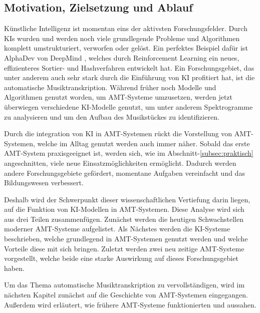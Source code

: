\subsection{Motivation, Zielsetzung und Ablauf}
Künstliche Intelligenz ist momentan eins der aktivsten Forschungsfelder.
Durch KIs wurden und werden noch viele grundlegende Probleme
und Algorithmen komplett umstrukturiert, verworfen oder gelöst.
Ein perfektes Beispiel dafür ist AlphaDev von DeepMind \cite{mankowitz2023faster},
welches durch Reinforcement Learning ein neues, effizienteres Sortier- und Hashverfahren entwickelt hat.
Ein Forschungsgebiet, das unter anderem auch sehr stark durch die Einführung von KI profitiert hat,
ist die automatische Musiktranskription.
Während früher noch Modelle und Algorithmen genutzt worden, um AMT-Systeme umzusetzen,
werden jetzt überwiegen verschiedene KI-Modelle genutzt,
um unter anderem Spektrogramme zu analysieren und um den Aufbau des Musikstückes zu identifizieren.

Durch die integration von KI in AMT-Systemen rückt die Vorstellung von AMT-Systemen,
welche im Alltag genutzt werden auch immer näher.
Sobald das erste AMT-System praxisgeeignet ist, werden sich, wie im Abschnitt-\ref{subsec:praktisch} angeschnitten,
viele neue Einsatzmöglichkeiten ermöglicht.
Dadurch werden andere Forschungsgebiete gefördert, momentane Aufgaben vereinfacht und das Bildungswesen verbessert.

Deshalb wird der Schwerpunkt dieser wissenschaftlichen Vertiefung darin liegen,
auf die Funktion von KI-Modellen in AMT-Systemen.
Diese Analyse wird sich aus drei Teilen zusammenfügen.
Zunächst werden die heutigen Schwachstellen moderner AMT-Systeme aufgelistet.
Als Nächstes werden die KI-Systeme beschrieben,
welche grundlegend in AMT-Systemen genutzt werden und welche Vorteile diese mit sich bringen.
Zuletzt werden zwei neu zeitige AMT-Systeme vorgestellt,
welche beide eine starke Auswirkung auf dieses Forschungsgebiet haben.

Um das Thema automatische Musiktranskription zu vervollständigen,
wird im nächsten Kapitel zunächst auf die Geschichte von AMT-Systemen eingegangen.
Außerdem wird erläutert, wie frühere AMT-Systeme funktionierten und aussahen.